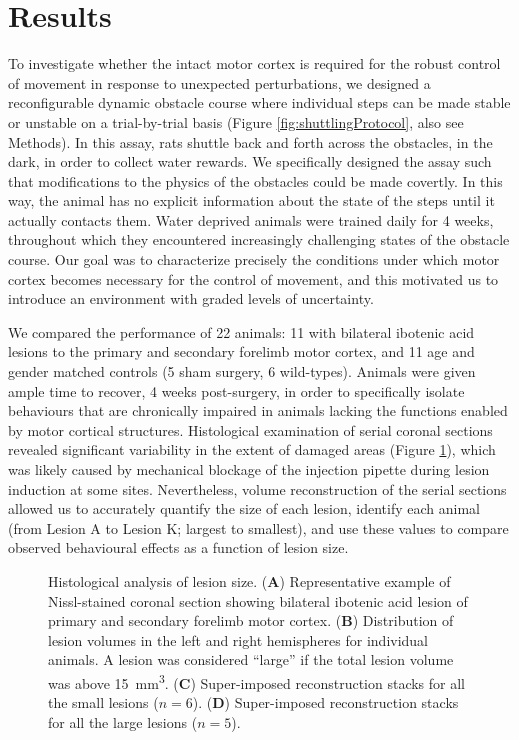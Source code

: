 \section{Results}

To investigate whether the intact motor cortex is required for the robust control of movement in response to unexpected perturbations, we designed a reconfigurable dynamic obstacle course where individual steps can be made stable or unstable on a trial-by-trial basis (Figure \ref{fig:shuttlingProtocol}, also see Methods). In this assay, rats shuttle back and forth across the obstacles, in the dark, in order to collect water rewards. We specifically designed the assay such that modifications to the physics of the obstacles could be made covertly. In this way, the animal has no explicit information about the state of the steps until it actually contacts them. Water deprived animals were trained daily for 4 weeks, throughout which they encountered increasingly challenging states of the obstacle course. Our goal was to characterize precisely the conditions under which motor cortex becomes necessary for the control of movement, and this motivated us to introduce an environment with graded levels of uncertainty.

We compared the performance of 22 animals: 11 with bilateral ibotenic acid lesions to the primary and secondary forelimb motor cortex, and 11 age and gender matched controls (5 sham surgery, 6 wild-types). Animals were given ample time to recover, 4 weeks post-surgery, in order to specifically isolate behaviours that are chronically impaired in animals lacking the functions enabled by motor cortical structures. Histological examination of serial coronal sections revealed significant variability in the extent of damaged areas (Figure \ref{fig:histology}), which was likely caused by mechanical blockage of the injection pipette during lesion induction at some sites. Nevertheless, volume reconstruction of the serial sections allowed us to accurately quantify the size of each lesion, identify each animal (from Lesion A to Lesion K; largest to smallest), and use these values to compare observed behavioural effects as a function of lesion size.

\begin{figure}
\centering

\caption{Histological analysis of lesion size. (\textbf{A}) Representative example of Nissl-stained coronal section showing bilateral ibotenic acid lesion of primary and secondary forelimb motor cortex. (\textbf{B}) Distribution of lesion volumes in the left and right hemispheres for individual animals. A lesion was considered ``large'' if the total lesion volume was above \SI{15}{\milli\meter\cubed}. (\textbf{C}) Super-imposed reconstruction stacks for all the small lesions ($n = 6$). (\textbf{D}) Super-imposed reconstruction stacks for all the large lesions ($n = 5$).}
\label{fig:histology}
\end{figure}

